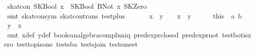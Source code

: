 \begin{isabellebody}
\ {}skat{}con\ {}SKBool\ x\ {}{}{}\ SKBool\ {}BNot\ x{}{}\ SKZero{}\isanewline
\ \ \ \ \ \ \isamarkupfalse%
\ {}smt\ skat{}con{}sym\ skat{}con{}trans\ test{}plus{}\isanewline
\ \ \isamarkupfalse%
\isanewline
\ \ \isamarkupfalse%
\ {}x\ {}\ y\ {}\ {}{}\ \ {}x\ {}\ y\ {}\ {}{}\isanewline
\ \ \isamarkupfalse%
\ this\ \ a\ b\ \isamarkupfalse%
\ {}y\ {}\ {}x{}\isanewline
\ \ \ \ \isamarkupfalse%
\ {}smt\ x{}{}def\ y{}{}def\ boolean{}algebra{}compl{}uniq\ pred{}expr{}closed\ pred{}expr{}not\ test{}bot{}is{}zero\ test{}top{}is{}one\ tests{}ba\ tests{}join\ tests{}meet{}\isanewline
{}\isamarkupfalse%
%
\endisatagproof

\end{isabellebody}
